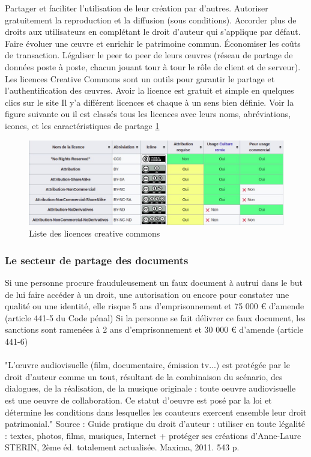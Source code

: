\documentclass[12pt]{report}
\begin{document}
Partager et faciliter l'utilisation de leur création par d'autres.
Autoriser gratuitement la reproduction et la diffusion (sous conditions).
Accorder plus de droits aux utilisateurs en complétant le droit d'auteur qui s'applique par défaut.
Faire évoluer une œuvre et enrichir le patrimoine commun.
Économiser les coûts de transaction.
Légaliser le peer to peer de leurs œuvres (réseau de partage de données poste à poste, chacun jouant tour à tour le rôle de client et de serveur)\cite{16}.\\

Les licences Creative Commons sont un outils pour garantir le partage et
l’authentification des œuvres.
Avoir la licence est gratuit et simple en quelques clics sur le site\cite{17}
Il y’a différent licences et chaque à un sens bien définie. Voir la figure suivante ou il est classés tous les licences avec leurs noms, abréviations, icones, et les caractéristiques de partage \ref{fig:creativecommons}
\begin{figure}[h]
    \centering
    \includegraphics[width=1\textwidth]{creative commons}
    \caption{Liste des licences creative commons}
    \label{fig:creativecommons}
\end{figure}

\subsubsection{Le secteur de partage des documents}
Si une personne procure frauduleusement un faux document à autrui dans le but de lui faire accéder à un droit, une autorisation ou encore pour constater une qualité ou une identité, elle risque 5 ans d'emprisonnement et 75 000 € d'amende (article 441-5 du Code pénal) Si la personne se fait délivrer ce faux document, les sanctions sont ramenées à 2 ans d’emprisonnement et 30 000 € d’amende (article 441-6)
\cite{17b}
\\\\
"L’œuvre audiovisuelle (film, documentaire, émission tv...) est protégée par le droit d'auteur comme un tout, résultant de la combinaison du scénario, des dialogues, de la réalisation, de la musique originale : toute oeuvre audiovisuelle est une oeuvre de collaboration. Ce statut d'oeuvre est posé par la loi et détermine les conditions dans lesquelles les coauteurs exercent ensemble leur droit patrimonial."
Source : Guide pratique du droit d’auteur : utiliser en toute légalité : textes, photos, films, musiques, Internet + protéger ses créations d'Anne-Laure STERIN, 2ème éd. totalement actualisée. Maxima, 2011. 543 p.
\end{document}
